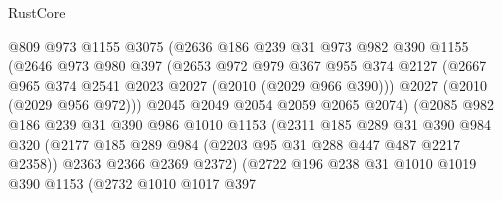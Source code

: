 \begin{lexlean}{RustCore}
\begin{coremodule}
                            @809
                            @973
                            @1155
                            @3075
                            (@2636
                              @186
                              @239
                              @31
                              @973
                              @982
                              @390
                              @1155
                              (@2646
                                @973
                                @980
                                @397
                                (@2653
                                  @972
                                  @979
                                  @367
                                  @955
                                  @374
                                  @2127
                                  (@2667 @965 @374 @2541 @2023 @2027 (@2010 (@2029 @966 @390)))
                                  @2027
                                  (@2010 (@2029 @956 @972)))
                                @2045
                                @2049
                                @2054
                                @2059
                                @2065
                                @2074)
                              (@2085
                                @982
                                @186
                                @239
                                @31
                                @390
                                @986
                                @1010
                                @1153
                                (@2311
                                  @185
                                  @289
                                  @31
                                  @390
                                  @984
                                  @320
                                  (@2177 @185 @289 @984 (@2203 @95 @31 @288 @447 @487 @2217 @2358))
                                  @2363
                                  @2366
                                  @2369
                                  @2372)
                                (@2722
                                  @196
                                  @238
                                  @31
                                  @1010
                                  @1019
                                  @390
                                  @1153
                                  (@2732
                                    @1010
                                    @1017
                                    @397

\end{coremodule}
\end{lexlean}
